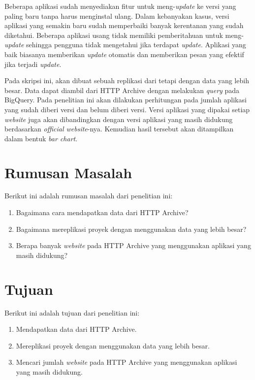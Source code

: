 Beberapa aplikasi sudah menyediakan fitur untuk meng-\textit{update} ke versi yang paling baru tanpa harus menginstal ulang. Dalam kebanyakan kasus, versi aplikasi yang semakin baru sudah memperbaiki banyak kerentanan yang sudah diketahui. Beberapa aplikasi usang tidak memiliki pemberitahuan untuk meng-\textit{update} sehingga pengguna tidak mengetahui jika terdapat \textit{update}. Aplikasi yang baik biasanya memberikan \textit{update} otomatis dan memberikan pesan yang efektif jika terjadi \textit{update}. 

Pada skripsi ini, akan dibuat sebuah replikasi dari \cite{pascal} tetapi dengan data yang lebih besar. Data dapat diambil dari HTTP Archive dengan melakukan \textit{query} pada BigQuery. Pada penelitian ini akan dilakukan perhitungan pada jumlah aplikasi yang sudah diberi versi dan belum diberi versi. Versi aplikasi yang dipakai setiap \textit{website} juga akan dibandingkan dengan versi aplikasi yang masih didukung berdasarkan \textit{official website}-nya. Kemudian hasil tersebut akan ditampilkan dalam bentuk \textit{bar chart}.


\section{Rumusan Masalah}
\label{sec:rumusan}
Berikut ini adalah rumusan masalah dari penelitian ini:
\begin{enumerate}
	\item Bagaimana cara mendapatkan data dari HTTP Archive?
	\item Bagaimana mereplikasi proyek \cite{pascal} dengan menggunakan data yang lebih besar?
	\item Berapa banyak \textit{website} pada HTTP Archive yang menggunakan aplikasi  yang masih didukung?
\end{enumerate}


\section{Tujuan}
\label{sec:tujuan}
Berikut ini adalah tujuan dari penelitian ini:
\begin{enumerate}
	\item Mendapatkan data dari HTTP Archive.
	\item Mereplikasi proyek \cite{pascal} dengan menggunakan data yang lebih besar.
	\item Mencari jumlah \textit{website} pada HTTP Archive yang menggunakan aplikasi yang masih didukung.
\end{enumerate}


